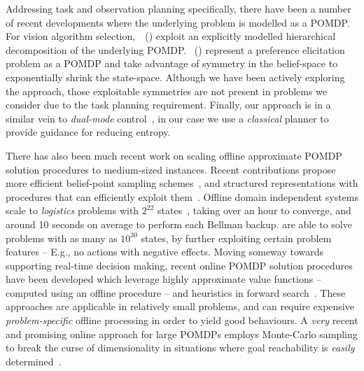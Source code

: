 





Addressing task and observation planning specifically, there have been
a number of recent developments where the underlying problem is
modelled as a POMDP.
For vision algorithm
selection,~\citeauthor{hippo-jnl}~(\citeyear{hippo-jnl}) exploit an
explicitly modelled hierarchical decomposition of the underlying
POMDP. \citeauthor{doshi08:pref_elic}~(\citeyear{doshi08:pref_elic})
represent a preference elicitation problem as a POMDP and take
advantage of symmetry in the belief-space to exponentially shrink the
state-space. Although we have been actively exploring
the \citeauthor{doshi08:pref_elic} approach, those exploitable
symmetries are not present in problems we consider due to the task
planning requirement.
Finally, our approach is in a similar vein to {\em dual-mode}
control~\cite{cassandra96actingunder}, in our case we use a {\em
classical} planner to provide guidance for reducing entropy.




There has also been much recent work on scaling offline approximate
POMDP solution procedures to medium-sized instances. Recent
contributions propose more efficient belief-point sampling
schemes~\cite{kurniawati:etal:2010,shani:etal:08}, and structured
representations with procedures that can efficiently exploit
them~\cite{brunskill:russell:2010,shani:etal:2008}. Offline domain
independent systems scale to {\em logistics} problems with $2^{22}$
states~\cite{shani:etal:2008}, taking over an hour to converge, and
around 10 seconds on average to perform each Bellman
backup. \citeauthor{brunskill:russell:2010} are able to solve problems
with as many as $10^{30}$ states, by further exploiting certain
problem features -- E.g., no actions with negative effects.
Moving someway towards supporting real-time decision making, recent
online POMDP solution procedures have been developed which leverage
highly approximate value functions -- computed using an offline
procedure -- and heuristics in forward
search~\cite{ross:etal:2008}. These approaches are applicable in
relatively small problems, and can require
expensive \emph{problem-specific} offline processing in order to yield
good behaviours.
A {\em very} recent and promising online approach for
large POMDPs employs Monte-Carlo sampling to break the curse of
dimensionality in situations where goal reachability is {\em easily}
determined~\cite{silver:veness:2010}. 

